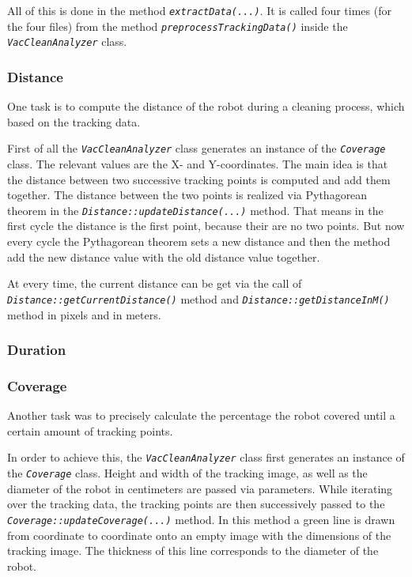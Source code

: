 \documentclass[twoside]{article}
\begin{document}
All of this is done in the method \textit{\texttt{extractData(...)}}. It is called four times (for the four files) from the method \textit{\texttt{preprocessTrackingData()}} inside the \textit{\texttt{VacCleanAnalyzer}} class.

\subsubsection{Distance} %
One task is to compute the distance of the robot during a cleaning process, which based on the tracking data.

First of all the \textit{\texttt{VacCleanAnalyzer}} class generates an instance of the \textit{\texttt{Coverage}} class. The relevant values are the X- and Y-coordinates. The main idea is that the distance between two successive tracking points is computed and add them together. The distance between the two points is realized via Pythagorean theorem in the \textit{\texttt{Distance::updateDistance(...)}} method. That means in the first cycle the distance is the first point, because their are no two points. But now every cycle the Pythagorean theorem sets a new distance and then the method add the new distance value with the old distance value together.


At every time, the current distance can be get via the call of \textit{\texttt{Distance::getCurrentDistance()}} method and \textit{\texttt{Distance::getDistanceInM()}} method in pixels and in meters.

\subsubsection{Duration} %
\subsubsection{Coverage} %

Another task was to precisely calculate the percentage the robot covered until a certain amount of tracking points.

In order to achieve this, the \textit{\texttt{VacCleanAnalyzer}} class first generates an instance of the \textit{\texttt{Coverage}} class.
Height and width of the tracking image, as well as the diameter of the robot in centimeters are passed via parameters.
While iterating over the tracking data, the tracking points are then successively passed to the \textit{\texttt{Coverage::updateCoverage(...)}} method.
In this method a green line is drawn from coordinate to coordinate onto an empty image with the dimensions of the tracking image.
The thickness of this line corresponds to the diameter of the robot.
\end{document}
